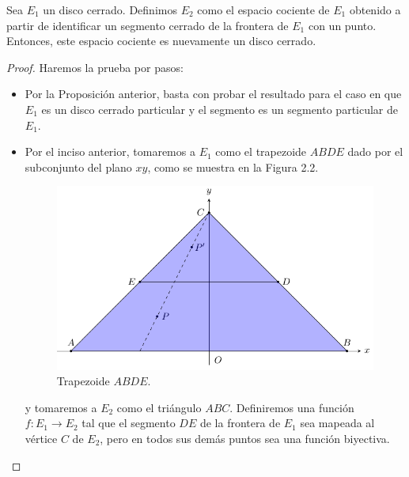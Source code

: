 \documentclass[12pt]{report}
\theoremstyle{largebreak}
\newcommand\cf[3]{\ensuremath{#1:#2\rightarrow#3}}
\begin{document}
    \begin{propo}
        \label{propC}
        Sea $E_1$ un disco cerrado. Definimos $E_2$ como el espacio cociente de $E_1$ obtenido a partir de identificar un segmento cerrado de la frontera de $E_1$ con un punto. Entonces, este espacio cociente es nuevamente un disco cerrado.
    \end{propo}

    \begin{proof}
        Haremos la prueba por pasos:
        \begin{itemize}
            \item Por la Proposición anterior, basta con probar el resultado para el caso en que $E_1$ es un disco cerrado particular y el segmento es un segmento particular de $E_1$.
            \item Por el inciso anterior, tomaremos a $E_1$ como el trapezoide $ABDE$ dado por el subconjunto del plano $xy$, como se muestra en la Figura 2.2.
            \begin{figure}
                \begin{center}
                    \includegraphics[scale=1]{images/fig_5.pdf}
                \end{center}
                \caption{Trapezoide $ABDE$.}
            \end{figure}
            y tomaremos a $E_2$ como el triángulo $ABC$. Definiremos una función $\cf{f}{E_1}{E_2}$ tal que el segmento $DE$ de la frontera de $E_1$ sea mapeada al vértice $C$ de $E_2$, pero en todos sus demás puntos sea una función biyectiva.


\end{itemize}
\end{proof}
\end{document}
